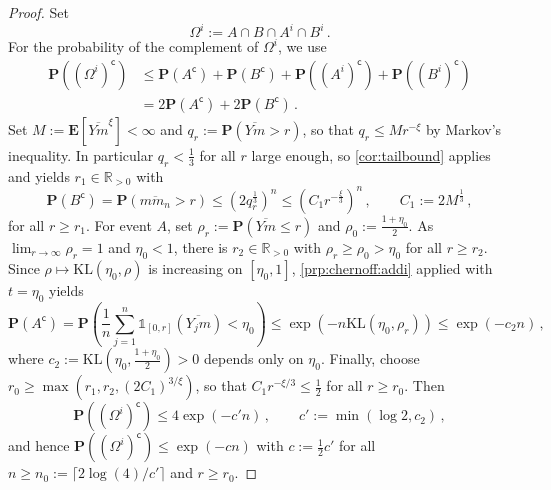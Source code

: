 \documentclass{article}
\newcommand{\R}{\mathbb{R}}
\newcommand{\Rpp}{\R_{>0}}
\newcommand{\lb}{\left(} %
\newcommand{\rb}{\right)} %
\newcommand{\br}[1]{\lb #1 \rb} %
\newcommand{\brOf}[1]{\!\br{#1}} %
\renewcommand{\Pr}{\mathbf{P}} %
\newcommand{\PrOf}[1]{\Pr\brOf{#1}}
\newcommand{\E}{\mathbf{E}} %
\newcommand{\Eof}[1]{\E[#1]}
\newcommand{\compl}{^\mathsf{c}}%
\newcommand{\ind}{\mathds{1}}%
\newcommand{\eqcm}{\,,} %
\newcommand{\eqfs}{\,.}
\newcommand{\kullback}{\mathrm{K\!L}} %
\newcommand{\ol}[2]{\overline{#1#2}}
\begin{document}
\begin{proof}
    Set
    \begin{equation}
        \Omega^i := A \cap B \cap A^i \cap B^i\eqfs
    \end{equation}
    For the probability of the complement of $\Omega^i$, we use
    \begin{align}
        \PrOf{(\Omega^i)\compl}
        &\leq
        \PrOf{A\compl} +  \PrOf{B\compl} + \PrOf{(A^i)\compl} + \PrOf{(B^i)\compl}
        \\&=
        2\PrOf{A\compl} + 2\PrOf{B\compl}
        \eqfs
    \end{align}
    Set $M := \Eof{\ol Ym^\xi} < \infty$ and $q_r := \PrOf{\ol Ym > r}$, so that
    $q_r \leq M r^{-\xi}$ by Markov's inequality. In particular $q_r < \frac13$ for all
    $r$ large enough, so \cref{cor:tailbound} applies and yields $r_1 \in \Rpp$ with
    \begin{equation}
        \PrOf{B\compl} = \PrOf{\ol m{m_n} > r}
        \leq
        \br{2 q_r^{\frac13}}^n
        \leq
        \br{C_1 r^{-\frac{\xi}3}}^n
        \eqcm
        \qquad
        C_1 := 2 M^{\frac13}
        \eqcm
    \end{equation}
    for all $r \geq r_1$.
    For event $A$, set $\rho_r := \PrOf{\ol {Y}{m} \leq r}$ and $\rho_0 := \frac{1+\eta_0}2$.
    As $\lim_{r\to\infty}\rho_r = 1$ and $\eta_0 < 1$, there is $r_2 \in \Rpp$ with
    $\rho_r \geq \rho_0 > \eta_0$ for all $r \geq r_2$.
    Since $\rho \mapsto \kullback(\eta_0, \rho)$ is increasing on $[\eta_0, 1]$,
    \cref{prp:chernoff:addi} applied with $t = \eta_0$ yields
    \begin{equation}
        \PrOf{A\compl}
        =
        \PrOf{\frac1n \sum_{j=1}^n \ind_{[0, r]}(\ol {Y_j}{m}) < \eta_0}
        \leq
        \exp\brOf{-n \kullback(\eta_0, \rho_r)}
        \leq
        \exp(-c_2 n)
        \eqcm
    \end{equation}
    where $c_2 := \kullback\brOf{\eta_0, \frac{1+\eta_0}2} > 0$ depends only on $\eta_0$.
    Finally, choose $r_0 \geq \max\brOf{r_1, r_2, (2C_1)^{3/\xi}}$, so that
    $C_1 r^{-\xi/3} \leq \frac12$ for all $r \geq r_0$. Then
    \begin{equation}
        \PrOf{(\Omega^i)\compl}
        \leq
        4 \exp(-c' n)
        \eqcm
        \qquad
        c' := \min\brOf{\log 2, c_2}
        \eqcm
    \end{equation}
    and hence $\PrOf{(\Omega^i)\compl} \leq \exp(-cn)$ with $c := \frac12 c'$ for all
    $n \geq n_0 := \lceil 2\log(4)/c' \rceil$ and $r \geq r_0$.
\end{proof}
\end{document}
